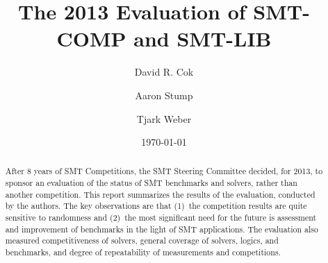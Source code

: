 \documentclass[smallcondensed]{svjour3}
\begin{document}
\title{The 2013 Evaluation of SMT-COMP and SMT-LIB}


\author{
David R. Cok 
\and  
Aaron Stump
\and  
Tjark Weber
}

%


\date{\today}
\maketitle

\begin{abstract}
After 8 years of SMT Competitions, the SMT Steering Committee decided,
for 2013, to sponsor an evaluation of the status of SMT benchmarks and
solvers, rather than another competition.  This report summarizes the
results of the evaluation, conducted by the authors.  The key
observations are that (1)~the competition results are quite sensitive
to randomness and (2)~the most significant need for the future is
assessment and improvement of benchmarks in the light of SMT
applications.  The evaluation also measured competitiveness of
solvers, general coverage of solvers, logics, and benchmarks, and
degree of repeatability of measurements and competitions.
\end{abstract}
\end{document}
